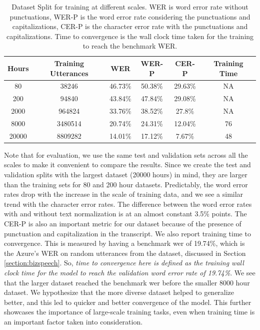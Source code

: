 \begin{table}[ht]
\centering
\begin{tabular}{c c c c c c}
\hline
  Hours & Training Utterances & WER & WER-P & CER-P & Training Time\\
 \hline
  80 & 38246 & 46.73\% & 50.38\% & 29.63\% & NA\\ 
  200 & 94840 & 43.84\% & 47.84\% & 29.08\% & NA\\
  2000 & 964824 & 33.76\% & 38.52\% & 27.8\% & NA\\
  8000 & 3480514 & 20.74\% & 24.31\% & 12.04\% & 76\\
  20000 & 8809282 & 14.01\% & 17.12\% & 7.67\% & 48\\
 \hline
\end{tabular}
\caption{\label{table:datascales}Dataset Split for training at different scales. WER is word error rate without punctuations, WER-P is the word error rate considering the punctuations and capitalizations, CER-P is the character error rate with the punctuations and capitalizations. Time to convergence is the wall clock time taken for the training to reach the benchmark WER.}
\end{table}

Note that for evaluation, we use the same test and validation sets across all the scales to make it convenient to compare the results. Since we create the test and validation splits with the largest dataset (20000 hours) in mind, they are larger than the training sets for 80 and 200 hour datasets. Predictably, the word error rates drop with the increase in the scale of training data, and we see a similar trend with the character error rates. The difference between the word error rates with and without text normalization is at an almost constant 3.5\% points. The CER-P is also an important metric for our dataset because of the presence of punctuation and capitalization in the transcript. We also report training time to convergence. This is measured by having a benchmark \acrshort{wer} of 19.74\%, which is the Azure's WER on random utterances from the dataset, discussed in Section \ref{section:bizspeech}. So, \emph{time to convergence here is defined as the training wall clock time for the model to reach the validation word error rate of 19.74\%}. We see that the larger dataset reached the benchmark \acrshort{wer} before the smaller 8000 hour dataset. We hypothesize that the more diverse dataset helped to generalize better, and this led to quicker and better convergence of the model. This further showcases the importance of large-scale training tasks, even when training time is an important factor taken into consideration.

